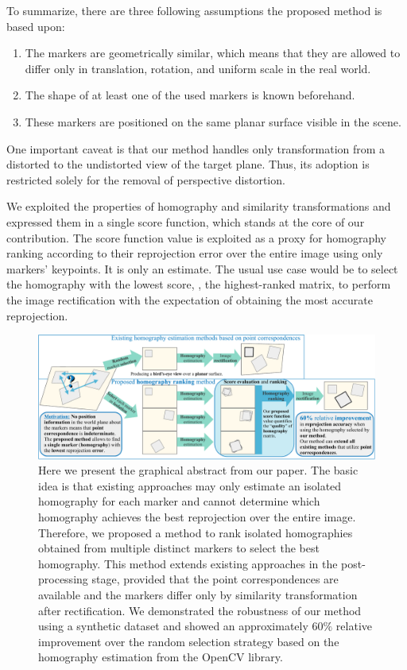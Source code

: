 To summarize, there are three following assumptions the proposed method is based upon:
\begin{enumerate}
    \item The markers are geometrically similar, which means that they are allowed to differ only in translation, rotation, and uniform scale in the real world.
    \item The shape of at least one of the used markers is known beforehand.
    \item These markers are positioned on the same planar surface visible in the scene.
\end{enumerate}
One important caveat is that our method handles only transformation from a distorted to the undistorted view of the target plane. Thus, its adoption is restricted solely for the removal of perspective distortion.

We exploited the properties of homography and similarity transformations and expressed them in a single score function, which stands at the core of our contribution. The score function value is exploited as a proxy for homography ranking according to their reprojection error over the entire image using only markers' keypoints. It is only an estimate. The usual use case would be to select the homography with the lowest score, \ietext{}, the highest-ranked matrix, to perform the image rectification with the expectation of obtaining the most accurate reprojection.

\begin{figure}[t]
    \centerline{\includegraphics[width=\linewidth]{figures/homography/graphical_abstract.pdf}}
    \caption[Graphical abstract for homography ranking]{Here we present the graphical abstract from our paper. The basic idea is that existing approaches may only estimate an isolated homography for each marker and cannot determine which homography achieves the best reprojection over the entire image. Therefore, we proposed a method to rank isolated homographies obtained from multiple distinct markers to select the best homography. This method extends existing approaches in the post-processing stage, provided that the point correspondences are available and the markers differ only by similarity transformation after rectification. We demonstrated the robustness of our method using a synthetic dataset and showed an approximately $60\%$ relative improvement over the random selection strategy based on the homography estimation from the OpenCV library.}
    \label{fig:GraphicalAbstract}
\end{figure}

